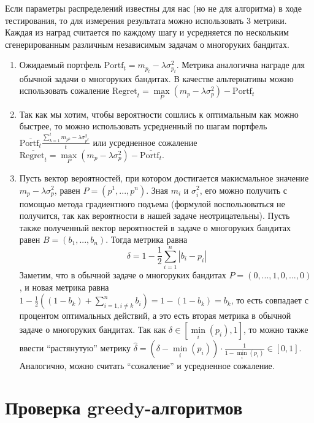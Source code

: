 \documentclass{article}
\begin{document}
Если параметры распределений известны для нас (но не для алгоритма) в ходе тестирования, то для измерения результата можно использовать 3 метрики. Каждая из наград считается по каждому шагу и усредняется по нескольким сгенерированным различным независимым задачам о многоруких бандитах.
\begin{enumerate}
    \item Ожидаемый портфель $\text{Portf}_t = m_{p_t} - \lambda \sigma_{p_t}^2$. Метрика аналогична награде для обычной задачи о многоруких бандитах. В качестве альтернативы можно использовать сожаление $\text{Regret}_t = \underset{P}{\max} \left( m_p - \lambda \sigma_p^2 \right) - \text{Portf}_t$
    \item Так как мы хотим, чтобы вероятности сошлись к оптимальным как можно быстрее, то можно использовать усредненный по шагам портфель $\overline{\text{Portf}_t} \frac{\sum_{k=1}^t m_{p^k} - \lambda \sigma_{p^k}^2}{t}$ или усредненное сожаление $\overline{\text{Regret}_t} = \underset{P}{\max} \left( m_p - \lambda \sigma_p^2 \right) - \overline{\text{Portf}_t}$.
    \item Пусть вектор вероятностей, при котором достигается макисмальное значение $m_p - \lambda \sigma_p^2$, равен $P = (p^1, ..., p^n)$. Зная $m_i$ и $\sigma_i^2$, его можно получить с помощью метода градиентного подъема (формулой воспользоваться не получится, так как вероятности в нашей задаче неотрицательны). Пусть также полученный вектор вероятностей в задаче о многоруких бандитах равен $B = (b_1, ..., b_n)$. Тогда метрика равна $$\delta = 1 - \frac{1}{2}\sum_{i=1}^n |b_i - p_i|$$
    Заметим, что в обычной задаче о многоруких бандитах $P = (0, ..., 1, 0, ..., 0)$, и новая метрика равна $1 - \frac{1}{2}\left( (1 - b_k) + \sum_{i = 1, i \neq k}^n b_i \right) = 1 - (1 - b_k) = b_k$, то есть совпадает с процентом оптимальных действий, а это есть вторая метрика в обычной задаче о многоруких бандитах. Так как $\delta \in [\underset{i}{\min} (p_i), 1]$, то можно также ввести ``растянутую'' метрику $\hat{\delta} = (\delta - \underset{i}{\min}(p_i) ) \cdot \frac{1}{1 - \underset{i}{\min}(p_i)} \in [0,1]$. Аналогично, можно считать ``сожаление'' и усредненное сожаление.
\end{enumerate}

\section{Проверка greedy-алгоритмов}
\end{document}
